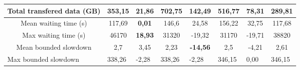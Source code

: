 \begin{table}[]
\begin{tabular}{cccccccc}
\multicolumn{1}{|c|}{Total transfered data (GB)}        & \multicolumn{1}{c|}{353,15}         & \multicolumn{1}{c|}{\textbf{21,86}} & \multicolumn{1}{c|}{702,75}         & \multicolumn{1}{c|}{142,49}          & \multicolumn{1}{c|}{516,77}         & \multicolumn{1}{c|}{78,31}         & \multicolumn{1}{c|}{289,81}            \\ \hline
\multicolumn{1}{|c|}{Mean waiting time (s)}             & \multicolumn{1}{c|}{117,69}         & \multicolumn{1}{c|}{\textbf{0,01}}  & \multicolumn{1}{c|}{146,6}          & \multicolumn{1}{c|}{24,58}           & \multicolumn{1}{c|}{156,22}         & \multicolumn{1}{c|}{32,75}         & \multicolumn{1}{c|}{117,68}            \\ \hline
\multicolumn{1}{|c|}{Max waiting time (s)}              & \multicolumn{1}{c|}{46170}          & \multicolumn{1}{c|}{\textbf{18,93}} & \multicolumn{1}{c|}{31320}          & \multicolumn{1}{c|}{-19,32}          & \multicolumn{1}{c|}{31170}          & \multicolumn{1}{c|}{-19,71}        & \multicolumn{1}{c|}{38820}             \\ \hline
\multicolumn{1}{|c|}{Mean bounded slowdown}             & \multicolumn{1}{c|}{2,7}            & \multicolumn{1}{c|}{3,45}           & \multicolumn{1}{c|}{2,23}           & \multicolumn{1}{c|}{\textbf{-14,56}} & \multicolumn{1}{c|}{2,5}            & \multicolumn{1}{c|}{-4,21}         & \multicolumn{1}{c|}{2,61}              \\ \hline
\multicolumn{1}{|l|}{Max bounded slowdown}              & \multicolumn{1}{l|}{338,26}         & \multicolumn{1}{l|}{-2,28}          & \multicolumn{1}{l|}{338,26}         & \multicolumn{1}{l|}{-2,28}           & \multicolumn{1}{l|}{346,15}         & \multicolumn{1}{l|}{0,00}          & \multicolumn{1}{l|}{346,15}            \\ \hline
\end{tabular}
\end{table}


